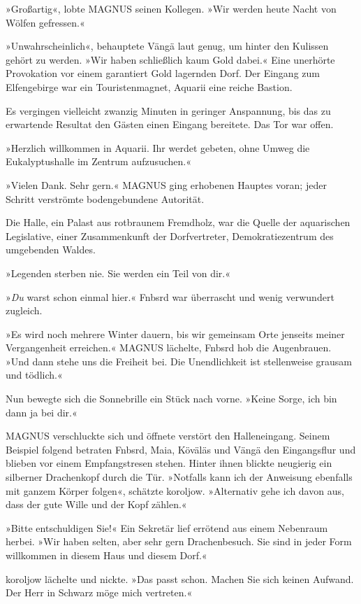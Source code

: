 »Großartig«, lobte MAGNUS seinen Kollegen. »Wir werden heute Nacht von Wölfen gefressen.«

»Unwahrscheinlich«, behauptete Vängä laut genug, um hinter den Kulissen gehört zu werden. »Wir haben schließlich kaum Gold dabei.« Eine unerhörte Provokation vor einem garantiert Gold lagernden Dorf. Der Eingang zum Elfengebirge war ein Touristenmagnet, Aquarii eine reiche Bastion.

Es vergingen vielleicht zwanzig Minuten in geringer Anspannung, bis das zu erwartende Resultat den Gästen einen Eingang bereitete. Das Tor war offen.

»Herzlich willkommen in Aquarii. Ihr werdet gebeten, ohne Umweg die Eukalyptushalle im Zentrum aufzusuchen.«

»Vielen Dank. Sehr gern.« MAGNUS ging erhobenen Hauptes voran; jeder Schritt verströmte bodengebundene Autorität.

Die Halle, ein Palast aus rotbraunem Fremdholz, war die Quelle der aquarischen Legislative, einer Zusammenkunft der Dorfvertreter, Demokratiezentrum des umgebenden Waldes.

»Legenden sterben nie. Sie werden ein Teil von dir.«

»\emph{Du} warst schon einmal hier.« Fnbsrd war überrascht und wenig verwundert zugleich.

»Es wird noch mehrere Winter dauern, bis wir gemeinsam Orte jenseits meiner Vergangenheit erreichen.« MAGNUS lächelte, Fnbsrd hob die Augenbrauen. »Und dann stehe uns die Freiheit bei. Die Unendlichkeit ist stellenweise grausam und tödlich.«

Nun bewegte sich die Sonnebrille ein Stück nach vorne. »Keine Sorge, ich bin dann ja bei dir.«

MAGNUS verschluckte sich und öffnete verstört den Halleneingang. Seinem Beispiel folgend betraten Fnbsrd, Maia, Köväläs und Vängä den Eingangsflur und blieben vor einem Empfangstresen stehen. Hinter ihnen blickte neugierig ein silberner Drachenkopf durch die Tür. »Notfalls kann ich der Anweisung ebenfalls mit ganzem Körper folgen«, schätzte koroljow. »Alternativ gehe ich davon aus, dass der gute Wille und der Kopf zählen.«

»Bitte entschuldigen Sie!« Ein Sekretär lief errötend aus einem Nebenraum herbei. »Wir haben selten, aber sehr gern Drachenbesuch. Sie sind in jeder Form willkommen in diesem Haus und diesem Dorf.«

koroljow lächelte und nickte. »Das passt schon. Machen Sie sich keinen Aufwand. Der Herr in Schwarz möge mich vertreten.«

